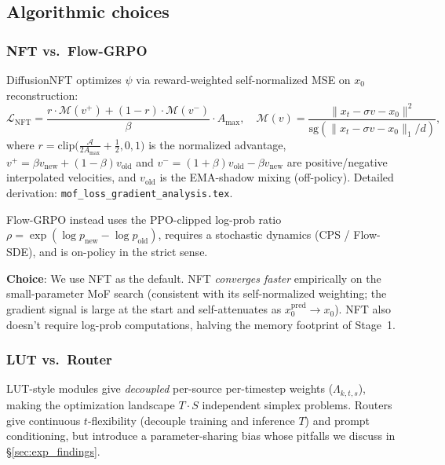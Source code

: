 \documentclass[11pt,a4paper]{article}
\newcommand{\loss}{\mathcal{L}}
\theoremstyle{definition}
\begin{document}
\subsection{Algorithmic choices}

\subsubsection{NFT vs.\ Flow-GRPO}
\label{ssec:nft_choice}

DiffusionNFT optimizes $\psi$ via reward-weighted self-normalized MSE on
$x_0$ reconstruction:
\begin{equation}
\loss_{\text{NFT}} = \frac{r\cdot\mathcal{M}(v^+) + (1-r)\cdot\mathcal{M}(v^-)}{\beta}\cdot A_{\max},\quad
\mathcal{M}(v) = \frac{\|x_t-\sigma v - x_0\|^2}{\mathrm{sg}(\|x_t-\sigma v - x_0\|_1/d)},
\label{eq:nft}
\end{equation}
where $r = \mathrm{clip}\big(\tfrac{\mathcal{A}}{2 A_{\max}}+\tfrac{1}{2},0,1\big)$
is the normalized advantage, $v^+ = \beta v_{\text{new}} + (1-\beta) v_{\text{old}}$
and $v^- = (1+\beta) v_{\text{old}} - \beta v_{\text{new}}$ are
positive/negative interpolated velocities, and $v_{\text{old}}$ is the
EMA-shadow mixing (off-policy). Detailed derivation:
\texttt{mof\_loss\_gradient\_analysis.tex}.

Flow-GRPO instead uses the PPO-clipped log-prob ratio
$\rho = \exp(\log p_{\text{new}} - \log p_{\text{old}})$, requires a
stochastic dynamics (CPS / Flow-SDE), and is on-policy in the strict sense.

\textbf{Choice}: We use NFT as the default. NFT \emph{converges faster}
empirically on the small-parameter MoF search (consistent with its
self-normalized weighting; the gradient signal is large at the start and
self-attenuates as $x_0^{\text{pred}}\to x_0$). NFT also doesn't require
log-prob computations, halving the memory footprint of Stage~1.

\subsubsection{LUT vs.\ Router}

LUT-style modules give \emph{decoupled} per-source per-timestep weights
($\Lambda_{k,t,s}$), making the optimization landscape
$T\!\cdot\!S$ independent simplex problems. Routers give continuous
$t$-flexibility (decouple training and inference $T$) and prompt
conditioning, but introduce a parameter-sharing bias whose pitfalls we
discuss in \S\ref{sec:exp_findings}.
\end{document}
